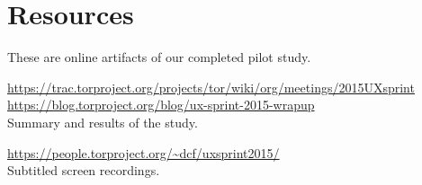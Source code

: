 \documentclass{sig-alternate-hotpets15}
\begin{document}
\section{Resources}

These are online artifacts of our completed pilot study.

\noindent \url{https://trac.torproject.org/projects/tor/wiki/org/meetings/2015UXsprint}\\
\noindent \url{https://blog.torproject.org/blog/ux-sprint-2015-wrapup}\\
\indent Summary and results of the study.

\noindent \url{https://people.torproject.org/~dcf/uxsprint2015/}\\
\indent Subtitled screen recordings.


 
\end{document}
